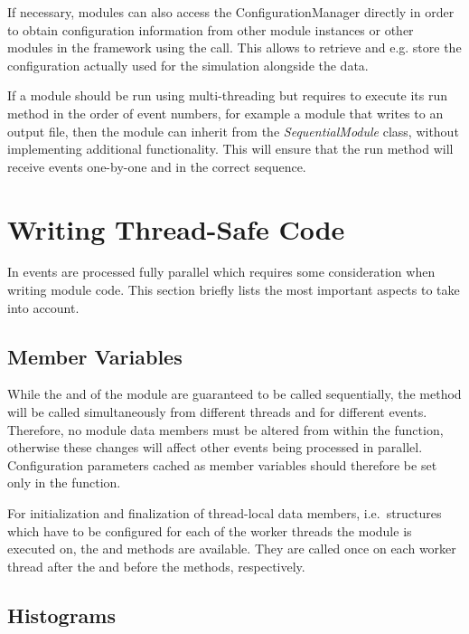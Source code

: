 If necessary, modules can also access the ConfigurationManager directly in order to obtain configuration information from other module instances or other modules in the framework using the  call.
This allows to retrieve and e.g. store the configuration actually used for the simulation alongside the data.

If a module should be run using multi-threading but requires to execute its run method in the order of event numbers, for example a module that writes to an output file, then the module can inherit from the \textit{SequentialModule} class, without implementing additional functionality.
This will ensure that the run method will receive events one-by-one and in the correct sequence.


\section{Writing Thread-Safe Code}
\label{sec:module_multithreading}

In \apsq events are processed fully parallel which requires some consideration when writing module code.
This section briefly lists the most important aspects to take into account.

\subsection{Member Variables}
\label{sec:multithreading_members}

While the  and  of the module are guaranteed to be called sequentially, the  method will be called simultaneously from different threads and for different events.
Therefore, no module data members must be altered from within the  function, otherwise these changes will affect other events being processed in parallel.
Configuration parameters cached as member variables should therefore be set only in the  function.

For initialization and finalization of thread-local data members, i.e.\ structures which have to be configured for each of the worker threads the module is executed on, the  and  methods are available. They are called once on each worker thread after the  and before the  methods, respectively.

\subsection{Histograms}

